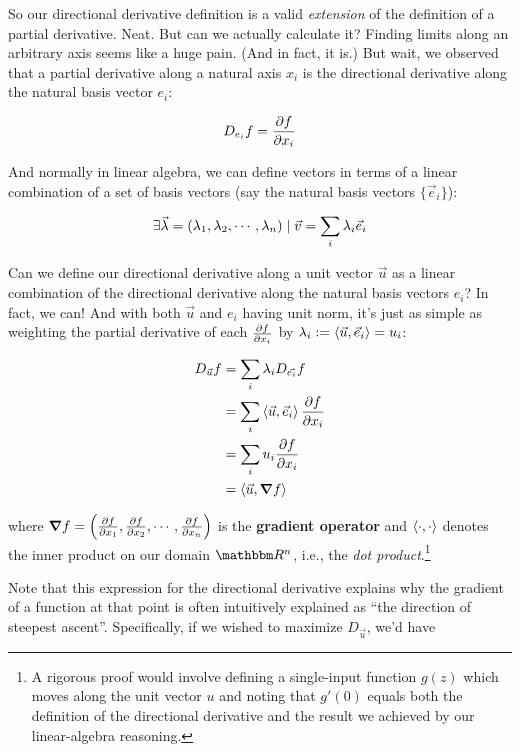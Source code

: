 \documentclass[letterpaper,12pt]{report}
\begin{document}
So our directional derivative definition is a valid 
\emph{extension}
of the definition of a partial derivative. Neat. 
But can we actually calculate it? Finding limits along an
arbitrary axis seems like a huge pain. (And in fact,
it is.) But wait, we observed that
a partial derivative along a natural axis \(x_i\)
is the directional derivative 
along the natural basis vector \(e_i\):

\[ D_{e_i}f = \pdv{f}{x_i} \]

And normally in linear algebra, we can define vectors
in terms of a linear combination of 
a set of basis vectors (say the natural basis
vectors \(\{\vec{e}_i\}\)):

\[\exists \vec{\lambda} = \left(\lambda_1, \lambda_2, \cdots, \lambda_n\right) \mid \vec{v} = \sum_i \lambda_i \vec{e}_i \]

Can we define our directional derivative along a unit vector
\(\vec{u}\) as a linear combination of 
the directional derivative along
the natural basis vectors \(e_i\)? In fact, we can!
And with both \(\vec{u}\) and \(e_i\) having unit norm, 
it's just as simple
as weighting the partial derivative of each \(\pdv{f}{x_i}\)
by \(\lambda_i := \left<\vec{u},\vec{e}_i\right> = u_i\):

\[\begin{split}
  D_{\vec{u}}f &= \sum_i \lambda_i D_{\vec{e_i}}f \\
      &= \sum_i \left<\vec{u},\vec{e}_i\right> \pdv{f}{x_i} \\
      &= \sum_i u_i \pdv{f}{x_i} \\
      &= \left<\vec{u},\grad{f}\right>
\end{split}
\]

where 
\(\grad{f} = \left(\pdv{f}{x_1}, \pdv{f}{x_2}, \cdots, \pdv{f}{x_n}\right)\)
is the \textbf{gradient operator} and 
\(\left<\cdot,\cdot\right>\) denotes the inner product
on our domain \(\domain{R}^n\), i.e.,
the \emph{dot product}.\footnote
{
A rigorous proof would involve defining a single-input function
\(g(z)\) which moves along the unit vector \(u\) and
noting that \(g'(0)\) equals both the definition of the
directional derivative and the result we achieved by our
linear-algebra reasoning.
}\par

Note that this expression for the directional derivative
explains why the gradient of a function at that point is
often intuitively explained as 
``the direction of steepest ascent''. Specifically,
if we wished to maximize \(D_{\vec{u}}\), we'd have
\end{document}
